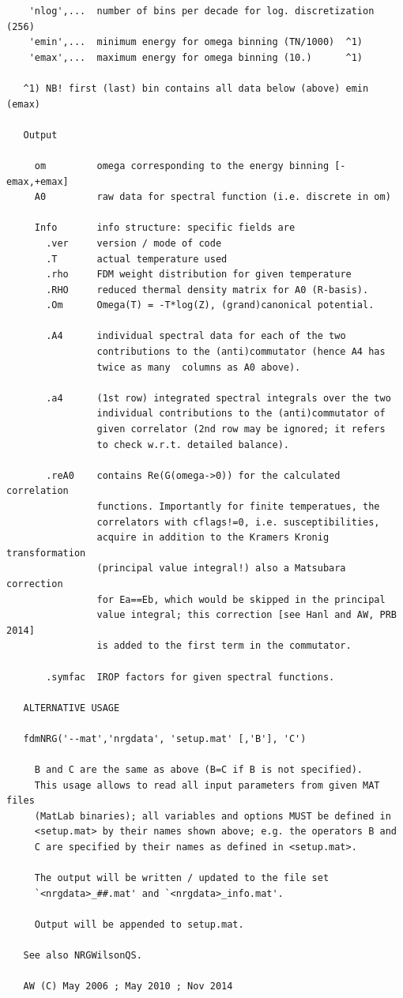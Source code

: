 \documentclass[twoside,12pt]{article}
\begin{document}
\begin{verbatim}
    'nlog',...  number of bins per decade for log. discretization (256)
    'emin',...  minimum energy for omega binning (TN/1000)  ^1)
    'emax',...  maximum energy for omega binning (10.)      ^1)
 
   ^1) NB! first (last) bin contains all data below (above) emin (emax)
 
   Output
 
     om         omega corresponding to the energy binning [-emax,+emax]
     A0         raw data for spectral function (i.e. discrete in om)
 
     Info       info structure: specific fields are
       .ver     version / mode of code
       .T       actual temperature used
       .rho     FDM weight distribution for given temperature
       .RHO     reduced thermal density matrix for A0 (R-basis).
       .Om      Omega(T) = -T*log(Z), (grand)canonical potential.
 
       .A4      individual spectral data for each of the two
                contributions to the (anti)commutator (hence A4 has
                twice as many  columns as A0 above).
 
       .a4      (1st row) integrated spectral integrals over the two
                individual contributions to the (anti)commutator of
                given correlator (2nd row may be ignored; it refers
                to check w.r.t. detailed balance).
 
       .reA0    contains Re(G(omega->0)) for the calculated correlation
                functions. Importantly for finite temperatues, the
                correlators with cflags!=0, i.e. susceptibilities,
                acquire in addition to the Kramers Kronig transformation
                (principal value integral!) also a Matsubara correction
                for Ea==Eb, which would be skipped in the principal
                value integral; this correction [see Hanl and AW, PRB 2014]
                is added to the first term in the commutator.
 
       .symfac  IROP factors for given spectral functions.
 
   ALTERNATIVE USAGE
 
   fdmNRG('--mat','nrgdata', 'setup.mat' [,'B'], 'C')
 
     B and C are the same as above (B=C if B is not specified).
     This usage allows to read all input parameters from given MAT files
     (MatLab binaries); all variables and options MUST be defined in
     <setup.mat> by their names shown above; e.g. the operators B and
     C are specified by their names as defined in <setup.mat>.
 
     The output will be written / updated to the file set
     `<nrgdata>_##.mat' and `<nrgdata>_info.mat'.
 
     Output will be appended to setup.mat.
 
   See also NRGWilsonQS.
 
   AW (C) May 2006 ; May 2010 ; Nov 2014
\end{verbatim}
\end{document}
